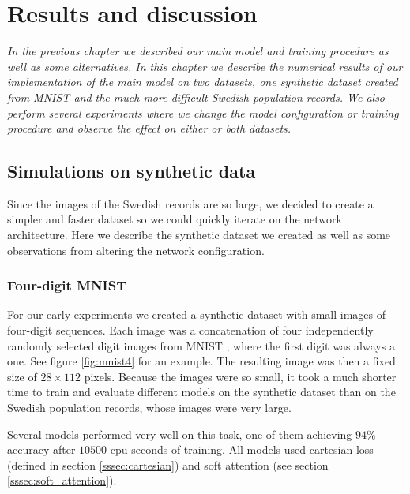 \chapter{Results and discussion}

\textit{
In the previous chapter we described our main model and training procedure as well as some alternatives.
In this chapter we describe the numerical results of our implementation of the main model on two datasets, one synthetic dataset created from MNIST and the much more difficult Swedish population records. We also perform several experiments where we change the model configuration or training procedure and observe the effect on either or both datasets. }

\section{Simulations on synthetic data}

Since the images of the Swedish records are so large, we decided to create a simpler and faster dataset so we could quickly iterate on the network architecture. Here we describe the synthetic dataset we created as well as some observations from altering the network configuration.

\subsection{Four-digit MNIST} \label{ssec:pretrain}



For our early experiments we created a synthetic dataset with small images of four-digit sequences.
Each image was a concatenation of four independently randomly selected digit images from MNIST \cite{MNIST_orig}, where the first digit was always a one. See figure \ref{fig:mnist4} for an example. The resulting image was then a fixed size of $28 \times 112$ pixels.
Because the images were so small, it took a much shorter time to train and evaluate different models on the synthetic dataset than on the Swedish population records, whose images were very large.

Several models performed very well on this task, one of them achieving $94\%$ accuracy after $10500$ cpu-seconds of training.
All models used cartesian loss (defined in section \ref{sssec:cartesian}) and soft attention (see section \ref{sssec:soft_attention}).

